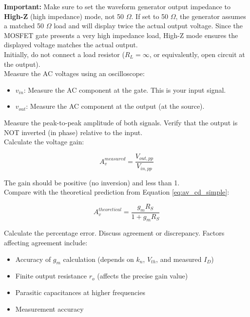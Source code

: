 \documentclass[10pt]{article}
\begin{document}
\textbf{Important:} Make sure to set the waveform generator output impedance to \textbf{High-Z} (high impedance) mode, not 50 $\Omega$. If set to 50 $\Omega$, the generator assumes a matched 50 $\Omega$ load and will display twice the actual output voltage. Since the MOSFET gate presents a very high impedance load, High-Z mode ensures the displayed voltage matches the actual output.\\

Initially, do not connect a load resistor ($R_L = \infty$, or equivalently, open circuit at the output).\\

Measure the AC voltages using an oscilloscope: 

\begin{itemize}
    \item $v_{in}$: Measure the AC component at the gate. This is your input signal.
    \item $v_{out}$: Measure the AC component at the output (at the source).
\end{itemize}
    
Measure the peak-to-peak amplitude of both signals.  Verify that the output is NOT inverted (in phase) relative to the input. \\

Calculate the voltage gain:

\begin{equation}
    A_v^{measured} = \frac{V_{out, pp}}{V_{in, pp}}
\end{equation}

The gain should be positive (no inversion) and less than 1.  \\

Compare with the theoretical prediction from Equation \ref{eq:av_cd_simple}:

\begin{equation}
    A_v^{theoretical} = \frac{g_m R_S}{1 + g_m R_S}
\end{equation}

Calculate the percentage error.  Discuss agreement or discrepancy.  Factors affecting agreement include:

\begin{itemize}
    \item Accuracy of $g_m$ calculation (depends on $k_n$, $V_{th}$, and measured $I_D$)
    \item Finite output resistance $r_o$ (affects the precise gain value)
    \item Parasitic capacitances at higher frequencies
    \item Measurement accuracy
\end{itemize}
\end{document}
